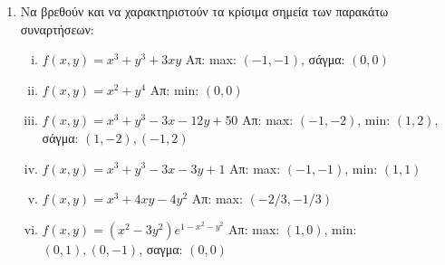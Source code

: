 \begin{enumerate}
  \item Να βρεθούν και να χαρακτηριστούν τα κρίσιμα σημεία  των παρακάτω συναρτήσεων:
    \begin{enumerate}[(i)]
      \item $ f(x,y) = x^{3} + y^{3} + 3xy $ 
        \hfill Απ: max: $(-1,-1)  $, σάγμα: $ (0,0) $
      \item $ f(x,y) = x^{2}+y^{4} $ 
        \hfill Απ: min: $ (0,0) $ 
      \item $ f(x,y) = x^{3} + y^{3} - 3x -12y + 50 $ 
        \hfill Απ: max: $ (-1,-2)$, min: $ (1,2) $, 
        σάγμα: $ (1,-2), (-1,2) $
      \item $ f(x,y) = x^{3} + y^{3} -3x -3y + 1 $ 
        \hfill Απ: max: $(-1,-1)  $, min: $ (1,1) $
      \item $ f(x,y) = x^{3} + 4xy -4y^{2} $ 
        \hfill Απ: max: $ (-2/3, -1/3)  $
      \item $ f(x,y) = (x^{2}-3y^{2})e^{1-x^{2}-y^{2}} $ 
        \hfill Απ: max: $ (1,0)$, min: $ (0,1), (0,-1) $, 
        σαγμα: $ (0,0) $
    \end{enumerate}
\end{enumerate}

